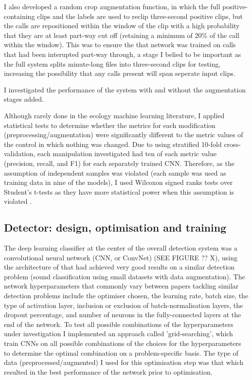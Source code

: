 \documentclass[11pt]{article}
\begin{document}
I also developed a random crop augmentation function, in which the full positive-containing clips and the labels are used to reclip three-second positive clips, but the calls are repositioned within the window of the clip with a high probability that they are at least part-way cut off (retaining a minimum of 20\% of the call within the window). This was to ensure the that network was trained on calls that had been interupted part-way through, a stage I belied to be important as the full system splits minute-long files into three-second clips for testing, increasing the possibility that any calls present will span seperate input clips. 

I investigated the performance of the system with and without the augmentation stages added. 

Although rarely done in the ecology machine learning literature, I applied statistical tests to determine whether the metrics for each modification (preprocessing/augmentation) were significantly different to the metric values of the control in which nothing was changed. Due to using stratified 10-fold cross-validation, each manipulation investigated had ten of each metric value (precision, recall, and F1) for each separately trained CNN. Therefore, as the assumption of independent samples was violated (each sample was used as training data in nine of the models), I used Wilcoxon signed ranks tests over Student's t-tests as they have more statistical power when this assumption is violated \citep{brownlee2018statistical}.


\subsection{Detector: design, optimisation and training}

The deep learning classifier at the center of the overall detection system was a convolutional neural network (CNN, or ConvNet) (SEE FIGURE ?? X), using the architecture of \cite{salamon2017deep} that had achieved very good results on a similar detection problem (sound classification using small datasets with data augmentation). The network hyperparameters that commonly vary between papers tackling similar detection problems include the optimiser chosen, the learning rate, batch size, the type of activation layer, inclusion or exclusion of batch-normalisation layers, the dropout percentage, and number of neurons in the fully-connected layers at the end of the network. To test all possible combinations of the hyperparameters under investigation I implemented an approach called 'grid-searching', which train CNNs on all possible combinations of the choices for the hyperparameters to determine the optimal combination on a problem-specific basis. The type of data (preprocessed/augmented) I used for this optimisation step was that which resulted in the best performance of the network prior to optimisation. 
\end{document}
